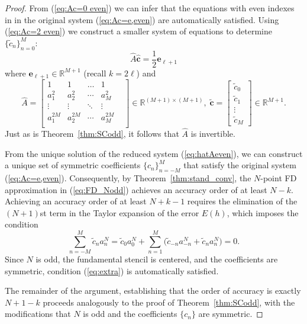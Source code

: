 \documentclass[12pt]{article}
\newcommand{\R}{\mathbb{R}}
\begin{document}
\begin{proof}
From (\ref{eq:Ac=0 even}) we can infer that the equations with even indexes in in the original system (\ref{eq:Ac=e,even}) are automatically satisfied.
Using (\ref{eq:Ac=2 even}) we construct a smaller system of equations to determine $\{\tilde c_n\}_{n=0}^M$:
\begin{equation}\label{eq:hatAeven}
	\hat A \hat{\mathbf c} = \frac{1}{2}\mathbf e_{\ell+1}
\end{equation}
where $\mathbf e_{\ell+1}\in\R^{M+1}$ (recall $k=2\ell$) and
\begin{equation} \label{mtrx:Atdl}
	\hat A = 
	\begin{bmatrix} 
		1 &1 &\dots &1\\
		a_1^2 & a_{2}^2 & \cdots & a_{M}^2 \\
		\vdots & \vdots &\ddots &\vdots & \\
		a_1^{2M} & a_{2}^{2M} & \cdots & a_{M}^{2M}\\  
	\end{bmatrix}\in\R^{(M+1)\times (M+1)},\;
	\tilde{\mathbf c} =
	\begin{bmatrix}
		\tilde c_0\\ \tilde c_1\\ \vdots\\ \tilde c_M
	\end{bmatrix}\in\R^{M+1}.
\end{equation}
Just as is Theorem~\ref{thm:SCodd}, it follows that $\hat A$ is invertible.

From the unique solution of the reduced system (\ref{eq:hatAeven}), we can construct a unique set of symmetric coefficients $\{c_n\}_{n=-M}^M$ that satisfy the original system (\ref{eq:Ac=e,even}).
Consequently, by Theorem~\ref{thm:stand_conv}, the $N$-point FD approximation in (\ref{eq:FD_Nodd}) achieves an accuracy order of at least $N-k$.
Achieving an accuracy order of at least $N+k-1$ requires the elimination of the $(N+1)$st term in the Taylor expansion of the error $E(h)$, which imposes the condition
\begin{equation}\label{eq:extra}
	\sum_{n=-M}^M \tilde c_n a_n^{N} = \tilde c_0 a_0^N + \sum_{n=1}^M \Big( \tilde c_{-n}a_{-n}^N + \tilde c_n a_n^N\Big) =0.
\end{equation}
Since $N$ is odd, the fundamental stencil is centered, and the coefficients are symmetric, condition (\ref{eq:extra}) is automatically satisfied.

The remainder of the argument, establishing that the order of accuracy is exactly $N+1-k$ proceeds analogously to the proof of Theorem~\ref{thm:SCodd}, with the modifications that $N$ is odd and the coefficients $\{c_n\}$ are symmetric.
\end{proof}
\end{document}
